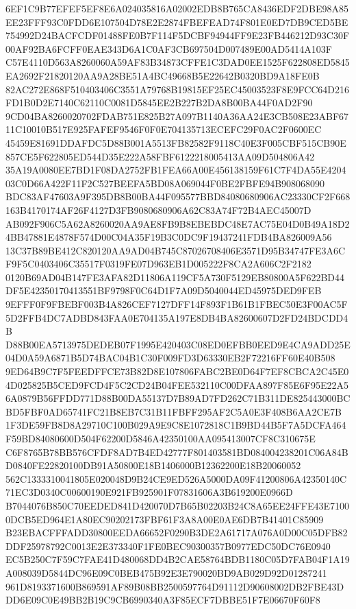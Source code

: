 \documentclass[UTF8,fontset=fandol,zihao=-4,a4paper]{ctexart}
\begin{document}
{{6EF1C9B77EFEF5EF8E6A024035816A02002EDB8B765CA8436EDF2DBE98A85EE23FFF93C0FDD6E107504D78E2E2874FBEFEAD74F801E0ED7DB9CED5BE
754992D24BACFCDF01488FE0B7F114F5DCBF94944FF9E23FB446212D93C30F00AF92BA6FCFF0EAE343D6A1C0AF3CB697504D007489E00AD5414A103F
C57E4110D563A8260060A59AF83B34873CFFE1C3DAD0EE1525F622808ED5845EA2692F21820120AA9A28BE51A4BC49668B5E22642B0320BD9A18FE0B
82AC272E868F510403406C3551A79768B19815EF25EC45003523F8E9FCC64D216FD1B0D2E7140C62110C0081D5845EE2B227B2DA8B00BA44F0AD2F90
9CD04BA8260020702FDAB751E825B27A097B1140A36AA24E3CB508E23ABF6711C10010B517E925FAFEF9546F0F0E704135713ECEFC29F0AC2F0600EC
45459E81691DDAFDC5D88B001A5513FB82582F9118C40E3F005CBF515CB90E857CE5F622805ED544D35E222A58FBF6122218005413AA09D504806A42
35A19A0080EE7BD1F08DA2752FB1FEA66A00E456138159F61C7F4DA55E420403C0D66A422F11F2C527BEEFA5BD08A069044F0BE2FBFE94B908068090
BDC83AF47603A9F395DB8B00BA44F095577BBD84080680906AC23330CF2F668163B4170174AF26F4127D3FB9080680906A62C83A74F72B4AEC45007D
AB092F906C5A62A8260020AA9AE8FB9B8EBEBDC48E7AC75E04D0B49A18D24BB47881E4878F574D00C04A35F19B3C0DC9F19437241FDB4BA826009A56
13C37B89BE412C820120AA9AD04B745C87026708406E3571D95B34747FE3A6CF9F5C0403406C35517F0319FE07D963EB1D005222F8CA2A606C2F2182
0120B69AD04B147FE3AFA82D11806A119CF5A730F5129EB80800A5F622BD44DF5E42350170413551BF9798F0C64D1F7A09D5040044ED45975DED9FEB
9EFFF0F9FBEBF003B4A826CEF7127DFF14F893F1B61B1FBEC50E3F00AC5F5D2FFB4DC7ADBD843FAA0E704135A197E8DB4BA82600607D2FD24BDCDD4B
D88B00EA5713975DEDEB07F1995E420403C08ED0EFBB0EED9E4CA9ADD25E04D0A59A6871B5D74BAC04B1C30F009FD3D63330EB2F72216FF60E40B508
9ED64B9C7F5FEEDFFCE73B82D8E107806FABC2BE0D64F7EF8CBCA2C45E04D025825B5CED9FCD4F5C2CD24B04FEE532110C00DFAA897F85E6F95E22A5
6A0879B56FFDD771D88B00DA55137D7B89AD7FD262C71B311DE825443000BCBD5FBF0AD65741FC21B8EB7C31B11FBFF295AF2C5A0E3F408B6AA2CE7B
1F3DE59FB8D8A29710C100B029A9E9C8E1072818C1B9BD44B5F7A5DCFA464F59BD84080600D504F62200D5846A42350100AA095413007CF8C310675E
C6F8765B78BB576CFDF8AD7B4ED42777F801403581BD084004238201C06A84BD0840FE22820100DB91A50800E18B1406000B12362200E18B20060052
562C1333310041805E020048D9B24CE9ED526A5000DA09F41200806A42350140C71EC3D0340C00600190E921FB925901F07831606A3B619200E0966D
B7044076B850C70EEDED841D420070D7B65B02203B24C8A65EE24FFE43E71000DCB5ED964E1A80EC90202173FBF61F3A8A00E0AE6DB7B41401C85909
B23EBACFFFADD30800EEDA66652F0290B3DE2A61717A076A0D00C05DFB82DDF25978792C0013E2E373340F1FE0BEC90300357B0977EDC50DC76E0940
EC5B250C7F59C7FAE41D480068DD4B2CAE58764BDB1180C05D7FAB04F1A19A008039D5844DC96E09C0BEB475B92E3E790020BD9AB029D92D01287241
961D8193371600B869591AF89B08BB2500597764D91112D90608002DB2FBE43DDD6E09C0E49BB2B19C9CB6990340A3F85ECF7DBBE51F7E06670F60F8
}}
\end{document}
